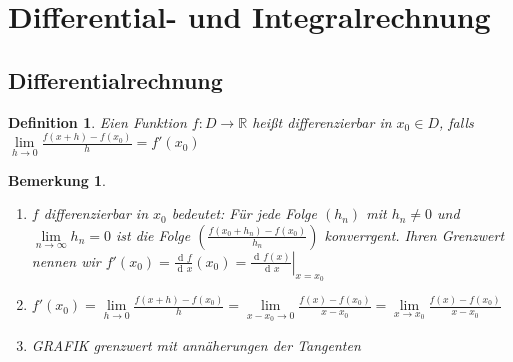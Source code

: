 \documentclass[a4paper,titlepage,oneside]{article}
\def\R{\ensuremath{\mathbb{R}} }
\newcommand{\der}{\operatorname{d\!}{}}
\renewcommand{\liminf}[2][n]{\ensuremath{\lim\limits_{#1 \rightarrow \infty}{#2}}}
\newcommand{\limnull}[2][n]{\ensuremath{\lim\limits_{#1 \rightarrow 0}{#2}}}
\newcommand{\limAB}[3][x]{\ensuremath{\lim\limits_{#1 \rightarrow #2}{#3}}}
\newcommand{\limA}[2][x_0]{\limAB{#1}{#2}}
\theoremstyle{thmstyle}
\newtheorem{defi}[satz]{Definition}
\newtheorem{bem}[satz]{Bemerkung}
\begin{document}
\newpage
\section{Differential- und Integralrechnung} %
\subsection{Differentialrechnung}

\begin{defi}
Eien Funktion $f : D \to \R$ heißt differenzierbar in $x_0 \in D$, falls $\limnull[h]{\frac{f(x + h) - f(x_0)}{h}} = f'(x_0)$
\end{defi}

\begin{bem}
\begin{enumerate}
\item $f$ differenzierbar in $x_0$ bedeutet:  Für jede Folge $(h_n)$ mit $h_n \ne 0$ und $\liminf{h_n} = 0$ ist die Folge $\left(\frac{f(x_0 + h_n) - f(x_0)}{h_n}\right)$ konverrgent. Ihren Grenzwert nennen wir $f'(x_0) = \frac{\der f}{\der x}(x_0) = \left.\frac{\der f(x)}{\der x}\right|_{x = x_0}$
\item $f'(x_0) = \limnull[h]{\frac{f(x + h) - f(x_0)}{h}} = \limnull[x-x_0]{\frac{f(x) - f(x_0)}{x-x_0}} = \limA{\frac{f(x) - f(x_0)}{x-x_0}}$
\item GRAFIK grenzwert mit annäherungen der Tangenten
\end{enumerate}
\end{bem}
\end{document}
